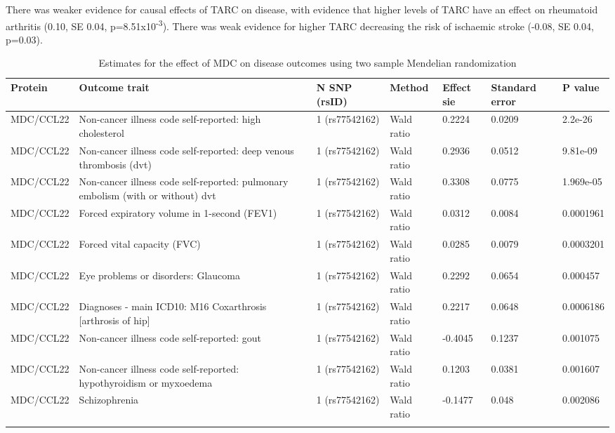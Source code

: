 \documentclass[11pt,twoside]{bristolthesis}
\begin{document}
There was weaker evidence for causal effects of TARC on disease, with evidence that higher levels of TARC have an effect on rheumatoid arthritis (0.10, SE 0.04, p=8.51x10\textsuperscript{-3}). There was weak evidence for higher TARC decreasing the risk of ischaemic stroke (-0.08, SE 0.04, p=0.03).
\begin{landscape}\begin{table}

\caption{\label{tab:MDC-disease-MR}Estimates for the effect of MDC on disease outcomes using two sample Mendelian randomization}
\centering
\begin{tabu} to 
\toprule
Protein & Outcome trait & N SNP (rsID) & Method & Effect sie & Standard error & P value\\
\midrule
MDC/CCL22 & Non-cancer illness code self-reported: high cholesterol & 1 (rs77542162) & Wald ratio & 0.2224 & 0.0209 & 2.2e-26\\
MDC/CCL22 & Non-cancer illness code self-reported: deep venous thrombosis (dvt) & 1 (rs77542162) & Wald ratio & 0.2936 & 0.0512 & 9.81e-09\\
MDC/CCL22 & Non-cancer illness code self-reported: pulmonary embolism (with or without) dvt & 1 (rs77542162) & Wald ratio & 0.3308 & 0.0775 & 1.969e-05\\
MDC/CCL22 & Forced expiratory volume in 1-second (FEV1) & 1 (rs77542162) & Wald ratio & 0.0312 & 0.0084 & 0.0001961\\
MDC/CCL22 & Forced vital capacity (FVC) & 1 (rs77542162) & Wald ratio & 0.0285 & 0.0079 & 0.0003201\\
\addlinespace
MDC/CCL22 & Eye problems or disorders: Glaucoma & 1 (rs77542162) & Wald ratio & 0.2292 & 0.0654 & 0.000457\\
MDC/CCL22 & Diagnoses - main ICD10: M16 Coxarthrosis [arthrosis of hip] & 1 (rs77542162) & Wald ratio & 0.2217 & 0.0648 & 0.0006186\\
MDC/CCL22 & Non-cancer illness code self-reported: gout & 1 (rs77542162) & Wald ratio & -0.4045 & 0.1237 & 0.001075\\
MDC/CCL22 & Non-cancer illness code self-reported: hypothyroidism or myxoedema & 1 (rs77542162) & Wald ratio & 0.1203 & 0.0381 & 0.001607\\
MDC/CCL22 & Schizophrenia & 1 (rs77542162) & Wald ratio & -0.1477 & 0.048 & 0.002086\\
\addlinespace

\end{tabu}
\end{table}
\end{landscape}
\end{document}
